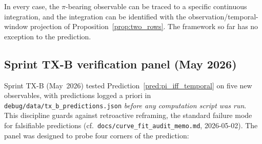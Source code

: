 \documentclass[11pt]{article}
\begin{document}
In every case, the $\pi$-bearing observable can be traced to a specific
continuous integration, and the integration can be identified with the
observation/temporal-window projection of
Proposition~\ref{prop:two_rows}.  The framework so far has no exception
to the prediction.

\subsection{Sprint TX-B verification panel (May 2026)}
\label{sec:tx_b}

Sprint TX-B (May~2026) tested Prediction~\ref{pred:pi_iff_temporal} on
five new observables, with predictions logged a priori in
\texttt{debug/data/tx\_b\_predictions.json} \emph{before any
computation script was run}.  This discipline guards against
retroactive reframing, the standard failure mode for falsifiable
predictions (cf.\ \texttt{docs/curve\_fit\_audit\_memo.md},
2026-05-02).  The panel was designed to probe four corners of the
prediction:
\end{document}
